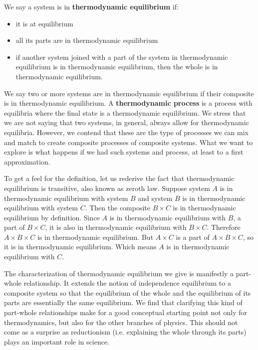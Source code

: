 \documentclass[letterpaper,twocolumn]{article}
\begin{document}
We say a system is in \textbf{thermodynamic equilibrium} if:
\begin{itemize}
	\item it is at equilibrium
	\item all its parts are in thermodynamic equilibrium
	\item if another system joined with a part of the system in thermodynamic equilibrium is in thermodynamic equilibrium, then the whole is in thermodynamic equilibrium.
\end{itemize}
We say two or more systems are in thermodynamic equilibrium if their composite is in thermodynamic equilibrium. A \textbf{thermodynamic process} is a process with equilibria where the final state is a thermodynamic equilibrium. We stress that we are not saying that two systems, in general, always allow for thermodynamic equilibria. However, we contend that these are the type of processes we can mix and match to create composite processes of composite systems. What we want to explore is what happens if we had such systems and process, at least to a first approximation.

To get a feel for the definition, let us rederive the fact that thermodynamic equilibrium is transitive, also known as zeroth law. Suppose system $A$ is in thermodynamic equilibrium with system $B$ and system $B$ is in thermodynamic equilibrium with system $C$. Then the composite $B \times C$ is in thermodynamic equilibrium by definition. Since $A$ is in thermodynamic equilibrium with $B$, a part of $B \times C$, it is also in thermodynamic equilibrium with $B \times C$. Therefore $A \times B \times C$ is in thermodynamic equilibrium. But $A \times C$ is a part of $A \times B \times C$, so it is in thermodynamic equilibrium. Which means $A$ is in thermodynamic equilibrium with $C$.

The characterization of thermodynamic equilibrium we give is manifestly a part-whole relationship. It extends the notion of independence equilibrium to a composite system so that the equilibrium of the whole and the equilibrium of its parts are essentially the same equilibrium. We find that clarifying this kind of part-whole relationships make for a good conceptual starting point not only for thermodynamics, but also for the other branches of physics. This should not come as a surprise as reductionism (i.e. explaining the whole through its parts) plays an important role in science.
\end{document}

